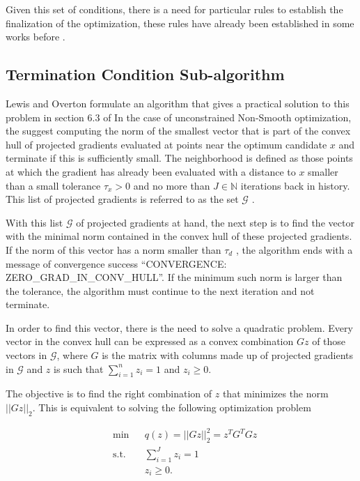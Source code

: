 Given this set of conditions, there is a need for particular rules to establish the finalization of the optimization, these rules have already been established in some works before \citep{overtonlewis, skajaa}.

\subsection{Termination Condition Sub-algorithm}
Lewis and Overton formulate an algorithm that gives a practical solution to this problem in section $6.3$ of \citep{overtonlewis}
In the case of unconstrained Non-Smooth optimization, the suggest computing the norm of the smallest vector that is part of the convex hull of projected gradients evaluated at points near the optimum candidate $x$ and terminate if this is sufficiently small. The neighborhood is defined as those points at which the gradient has already been evaluated with a distance to $x$ smaller than a small tolerance $\tau_x > 0$ and no more than $J \in \mathbb{N}$ iterations back in history. This list of projected gradients is referred to as the set $\mathcal{G}$ \citep{overtonlewis}.

With this list $\mathcal{G}$ of projected gradients at hand, the next step is to find the vector with the minimal norm contained in the convex hull of these projected gradients.  If the norm of this vector has a norm smaller than $\tau_d$ , the algorithm ends with a message of convergence success ``CONVERGENCE: ZERO\_GRAD\_IN\_CONV\_HULL''. If the minimum such norm is larger than the tolerance, the algorithm must continue to the next iteration and not terminate.

In order to find this vector, there is the need to solve a quadratic problem. Every vector in the convex hull can be expressed as a convex combination $Gz$ of those vectors in $\mathcal{G}$, where $G$ is the matrix with columns made up of projected gradients in $\mathcal{G}$ and $z$ is such that $\sum_{i=1}^n z_i = 1$ and $z_i \geq 0$.

The objective is to find the right combination of $z$ that minimizes the norm $||Gz||_2$.  This is equivalent to solving the following optimization problem

\begin{equation} \label{quadraticproblem}
  \begin{aligned}
    & {\text{min}}
    & & q(z) = ||G z ||_2^2 = z^TG^TGz  \\
    & \text{s.t.}
    & & \sum_{i = 1} ^J z_i = 1 \; \\
    & & & z_i \geq 0.
  \end{aligned}
\end{equation}

